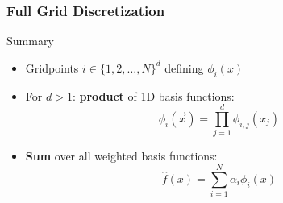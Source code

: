 \begin{frame}
  \frametitle{Full Grid Discretization}
  \topline
  \vspace{-10px}
  \begin{block}{Summary}
    \begin{itemize}
      \item Gridpoints $i \in \{1,2,\dots,N\}^d$ defining $\phi_i(x)$
        \vspace{5px}
        \item For $d > 1$: \textbf{product} of 1D basis functions: \\
          $$\phi_i(\vec{x}) = \prod_{j=1}^d{\phi_{i,j}(x_j)}$$
        \item \textbf{Sum} over all weighted basis functions: \\
          $$\hat{f}(x) = \sum_{i=1}^N{\alpha_i \phi_i(x)}$$
    \end{itemize}

  \end{block}
\end{frame}

